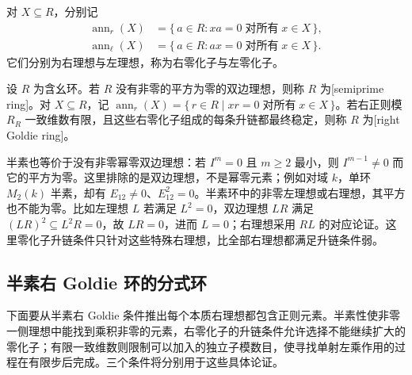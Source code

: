 对 \(X\subseteq R\)，分别记
\[
	\begin{aligned}
		\operatorname{ann}_r(X)&=\{\,a\in R:xa=0\;\text{对所有}\;x\in X\,\},\\
		\operatorname{ann}_{\ell}(X)&=\{\,a\in R:ax=0\;\text{对所有}\;x\in X\,\}.
	\end{aligned}
\]
它们分别为右理想与左理想，称为右零化子与左零化子。

\begin{definition}\label{b2:def:semiprime-right-goldie}
	设 \(R\) 为含幺环。若 \(R\) 没有非零的平方为零的双边理想，则称 \(R\) 为[semiprime ring]。对 \(X\subseteq R\)，记 \(\operatorname{ann}_r(X)=\{\,r\in R\mid xr=0\;\text{对所有}\;x\in X\,\}\)。若右正则模 \(R_R\) 一致维数有限，且这些右零化子组成的每条升链都最终稳定，则称 \(R\) 为[right Goldie ring]。
\end{definition}

半素也等价于没有非零幂零双边理想：若 \(I^m=0\) 且 \(m\ge2\) 最小，则 \(I^{m-1}\ne0\) 而它的平方为零。这里排除的是双边理想，不是幂零元素；例如对域 \(k\)，单环 \(M_2(k)\) 半素，却有 \(E_{12}\ne0\)、\(E_{12}^2=0\)。半素环中的非零左理想或右理想，其平方也不能为零。比如左理想 \(L\) 若满足 \(L^2=0\)，双边理想 \(LR\) 满足 \((LR)^2\subseteq L^2R=0\)，故 \(LR=0\)，进而 \(L=0\)；右理想采用 \(RL\) 的对应论证。这里零化子升链条件只针对这些特殊右理想，比全部右理想都满足升链条件弱。

\subsection{半素右 Goldie 环的分式环}
\label{b2:subsec:1902:02}

下面要从半素右 Goldie 条件推出每个本质右理想都包含正则元素。半素性使非零一侧理想中能找到乘积非零的元素，右零化子的升链条件允许选择不能继续扩大的零化子；有限一致维数则限制可以加入的独立子模数目，使寻找单射左乘作用的过程在有限步后完成。三个条件将分别用于这些具体论证。

